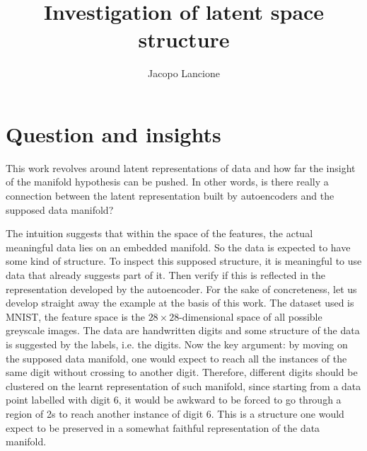 \documentclass[twocolumn,gsifonts,twoside]{gsipaper}
\begin{document}
\title{\textbf{Investigation of latent space structure}}



\author{Jacopo Lancione}
\address{Università di Torino, jacopo.lancione@edu.unito.it}

\maketitle

\section{Question and insights}
This work revolves around latent representations of data and how far the insight of the manifold hypothesis can be pushed. In other words, is there really a connection between the latent representation built by autoencoders and the supposed data manifold?

The intuition suggests that within the space of the features, the actual meaningful data lies on an embedded manifold. So the data is expected to have some kind of structure. To inspect this supposed structure, it is meaningful to use data that already suggests part of it. Then verify if this is reflected in the representation developed by the autoencoder. For the sake of concreteness, let us develop straight away the example at the basis of this work. The dataset used is MNIST, the feature space is the $28\times28$-dimensional space of all possible greyscale images. The data are handwritten digits and some structure of the data is suggested by the labels, i.e. the digits. Now the key argument: by moving on the supposed data manifold, one would expect to reach all the instances of the same digit without crossing to another digit. Therefore, different digits should be clustered on the learnt representation of such manifold, since starting from a data point labelled with digit 6, it would be awkward to be forced to go through a region of 2s to reach another instance of digit 6. This is a structure one would expect to be preserved in a somewhat faithful representation of the data manifold.
\end{document}
